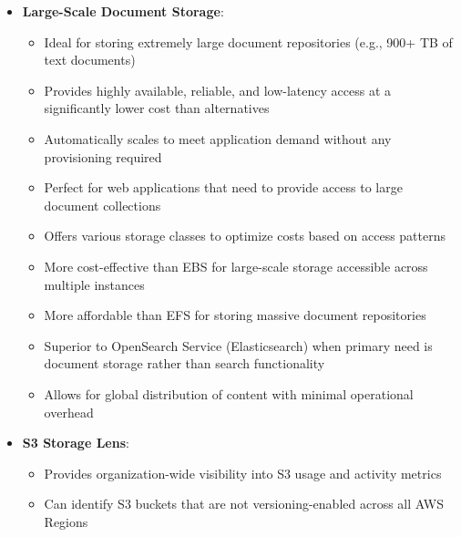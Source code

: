 \documentclass[11pt,a4paper]{report}
\begin{document}
\begin{itemize}
\begin{itemize}
\begin{itemize}
  \item Enable S3 Block Public Access feature at the account level
  \item Use AWS Organizations to create SCPs that prevent IAM users from changing this setting
  \item Apply the SCP to the account or organizational units
\end{itemize}
  \item More effective than monitoring solutions like GuardDuty or Trusted Advisor that require remediation
  \item Prevents accidental exposure with minimal administrative overhead
  \item More appropriate than using Resource Access Manager which is designed for sharing resources, not monitoring
\end{itemize}
  \item \textbf{Large-Scale Document Storage}:
\begin{itemize}
  \item Ideal for storing extremely large document repositories (e.g., 900+ TB of text documents)
  \item Provides highly available, reliable, and low-latency access at a significantly lower cost than alternatives
  \item Automatically scales to meet application demand without any provisioning required
  \item Perfect for web applications that need to provide access to large document collections
  \item Offers various storage classes to optimize costs based on access patterns
  \item More cost-effective than EBS for large-scale storage accessible across multiple instances
  \item More affordable than EFS for storing massive document repositories
  \item Superior to OpenSearch Service (Elasticsearch) when primary need is document storage rather than search functionality
  \item Allows for global distribution of content with minimal operational overhead
\end{itemize}
  \item \textbf{S3 Storage Lens}:
\begin{itemize}
  \item Provides organization-wide visibility into S3 usage and activity metrics
  \item Can identify S3 buckets that are not versioning-enabled across all AWS Regions

\end{itemize}
\end{itemize}
\end{document}
